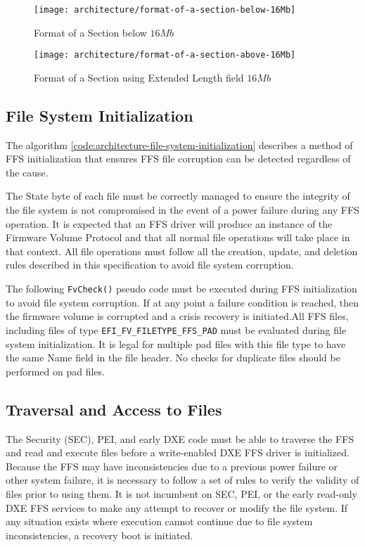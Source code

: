 \begin{figure}[!htbp]
	\centering
	\texttt{[image: architecture/format-of-a-section-below-16Mb]}
	\caption{Format of a Section below $ 16Mb $}\label{fig:architecture-format-of-a-section-below-16Mb}
\end{figure}

\begin{figure}[!htbp]
	\centering
	\texttt{[image: architecture/format-of-a-section-above-16Mb]}
	\caption{Format of a Section using Extended Length field $ 16Mb $}\label{fig:architecture-format-of-a-section-above-16Mb}
\end{figure}


\subsection{File System Initialization}\label{subsection:file-system-initialization}
The algorithm \ref{code:architecture-file-system-initialization} describes a method of FFS initialization that ensures FFS file corruption can be detected regardless of the cause.

The State byte of each file must be correctly managed to ensure the integrity of the file system is
not compromised in the event of a power failure during any FFS operation. It is expected that an FFS
driver will produce an instance of the Firmware Volume Protocol and that all normal file operations
will take place in that context. All file operations must follow all the creation, update, and deletion
rules described in this specification to avoid file system corruption.

The following \verb|FvCheck()| pseudo code must be executed during FFS initialization to avoid file
system corruption. If at any point a failure condition is reached, then the firmware volume is
corrupted and a crisis recovery is initiated.All FFS files, including files of type
\verb|EFI_FV_FILETYPE_FFS_PAD| must be evaluated during file system initialization. It is legal for
multiple pad files with this file type to have the same Name field in the file header. No checks for
duplicate files should be performed on pad files.


\subsection{Traversal and Access to Files}
The Security (SEC), PEI, and early DXE code must be able to traverse the FFS and read and execute
files before a write-enabled DXE FFS driver is initialized. Because the FFS may have
inconsistencies due to a previous power failure or other system failure, it is necessary to follow a set
of rules to verify the validity of files prior to using them. It is not incumbent on SEC, PEI, or the
early read-only DXE FFS services to make any attempt to recover or modify the file system. If any
situation exists where execution cannot continue due to file system inconsistencies, a recovery boot
is initiated.

